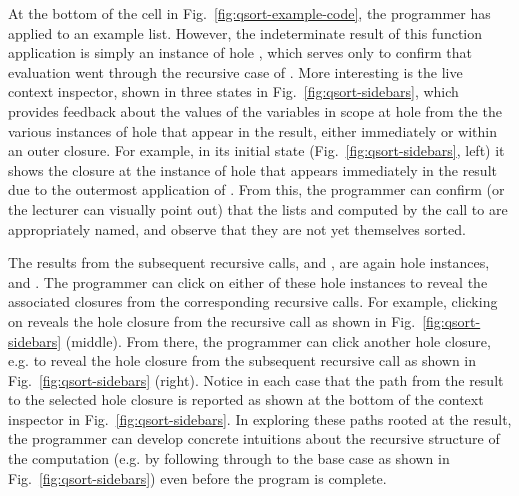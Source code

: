 At the bottom of the cell in Fig.~\ref{fig:qsort-example-code}, the programmer has applied  to an example list. However, 
the indeterminate result of this function application is simply an instance of hole , which serves only to confirm that evaluation went through the recursive case of . 
More interesting is the live context inspector, shown in three states in Fig.~\ref{fig:qsort-sidebars}, which provides feedback about the values of the variables in scope at hole  from the the various instances of hole  that appear in the result, either immediately or within an outer closure. For example, in its initial state (Fig.~\ref{fig:qsort-sidebars}, left) it shows the closure at the instance of hole  that appears immediately in the result due to the outermost application of . From this, the programmer can confirm (or the lecturer can visually point out) that 
the lists  and  computed by the call to  are appropriately named, and observe that they are not yet themselves sorted.

The results from the subsequent recursive calls,  and , are again hole instances,  and . 
The programmer can click on either of these hole instances to reveal the associated closures from the corresponding recursive calls. 
For example, clicking on  reveals the hole closure from the  recursive call as shown in Fig.~\ref{fig:qsort-sidebars} (middle). 
From there, the programmer can click another hole closure, e.g.  to reveal the hole closure from the subsequent  recursive call as shown in Fig.~\ref{fig:qsort-sidebars} (right). 
Notice in each case that the path from the result to the selected hole closure is reported as shown at the bottom of the context inspector in Fig.~\ref{fig:qsort-sidebars}. 
In exploring these paths rooted at the result, the programmer can develop concrete intuitions about the recursive structure of the computation (e.g. by following through to the base case as shown in Fig.~\ref{fig:qsort-sidebars}) even before the program is complete. 

